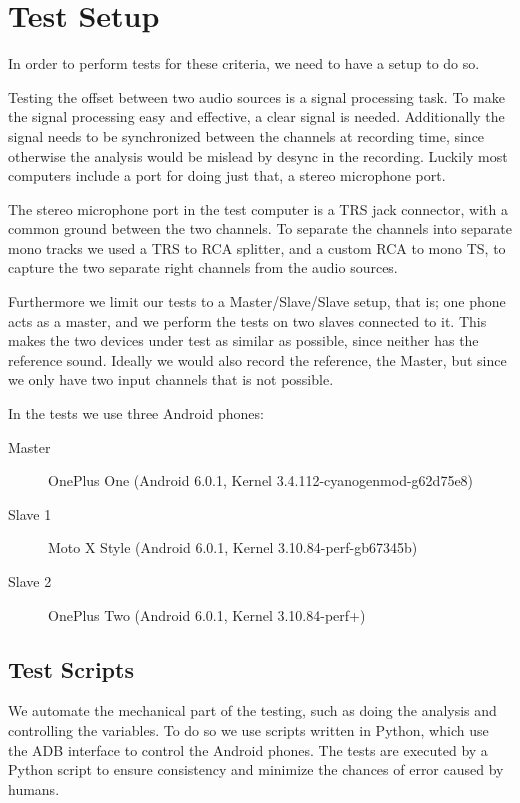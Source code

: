 \section{Test Setup}\label{sec:test_setup}
In order to perform tests for these criteria, we need to have a setup to do so.

Testing the offset between two audio sources is a signal processing
task. To make the signal processing easy and effective, a clear signal is
needed. Additionally the signal needs to be synchronized between the
channels at recording time, since otherwise the analysis would be
mislead by desync in the recording. Luckily most computers include
a port for doing just that, a stereo microphone port.

The stereo microphone port in the test computer is a \ac{TRS} jack
connector, with a common ground between the two channels. To separate
the channels into separate mono tracks we used a \ac{TRS} to \ac{RCA}
splitter, and a custom \ac{RCA} to mono \ac{TS}, to capture the two
separate right channels from the audio sources. 

Furthermore we limit our tests to a Master/Slave/Slave setup, that is;
one phone acts as a master, and we perform the tests on two slaves
connected to it. This makes the two devices under test as similar as
possible, since neither has the reference sound.
Ideally we would also record the reference, the Master,
but since we only have two input channels that is not possible.

In the tests we use three Android phones:
\begin{description}
	\item[Master]{OnePlus One (Android 6.0.1, Kernel 3.4.112-cyanogenmod-g62d75e8)}
	\item[Slave 1]{Moto X Style (Android 6.0.1, Kernel 3.10.84-perf-gb67345b)}
	\item[Slave 2]{OnePlus Two (Android 6.0.1, Kernel 3.10.84-perf+)}
\end{description}

\subsection{Test Scripts}
We automate the mechanical part of the testing, such as doing the
analysis and controlling the variables. To do so we use scripts written
in Python, which use the \ac{ADB} interface to control the Android
phones. The tests are executed by a Python script to ensure
consistency and minimize the chances of error caused by humans.

